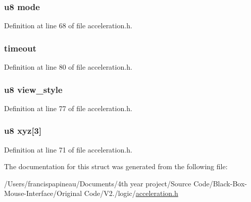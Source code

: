 \hypertarget{structaccel_a7cea6ae40aa46b41e3806213a39718c6}{
\subsubsection[{mode}]{\setlength{\rightskip}{0pt plus 5cm}u8 {\bf mode}}}\label{structaccel_a7cea6ae40aa46b41e3806213a39718c6}


\-Definition at line 68 of file acceleration.\-h.

\hypertarget{structaccel_a735bf6536b07682f96c9417b0f1e9079}{
\subsubsection[{timeout}]{ {\bf timeout}}}\label{structaccel_a735bf6536b07682f96c9417b0f1e9079}


\-Definition at line 80 of file acceleration.\-h.

\hypertarget{structaccel_a12daf57ef9d0a0b0e764ac25f7f4f536}{
\subsubsection[{view\-\_\-style}]{\setlength{\rightskip}{0pt plus 5cm}u8 {\bf view\-\_\-style}}}\label{structaccel_a12daf57ef9d0a0b0e764ac25f7f4f536}


\-Definition at line 77 of file acceleration.\-h.

\hypertarget{structaccel_af9cba48daaf1e24eb2df884547c0efcc}{
\subsubsection[{xyz}]{\setlength{\rightskip}{0pt plus 5cm}u8 {\bf xyz}\mbox{[}3\mbox{]}}}\label{structaccel_af9cba48daaf1e24eb2df884547c0efcc}


\-Definition at line 71 of file acceleration.\-h.



\-The documentation for this struct was generated from the following file\-:\begin{DoxyCompactItemize}
\item 
/\-Users/francispapineau/\-Documents/4th year project/\-Source Code/\-Black-\/\-Box-\/\-Mouse-\/\-Interface/\-Original Code/\-V2./logic/\hyperlink{acceleration_8h}{acceleration.\-h}\end{DoxyCompactItemize}
